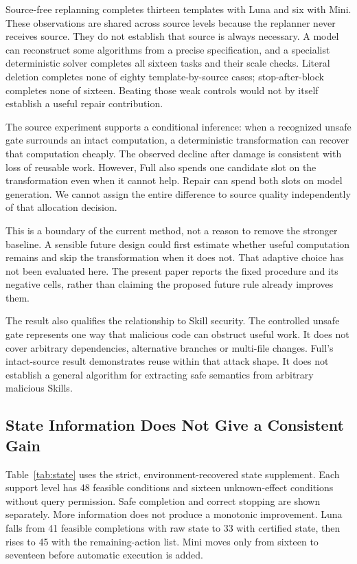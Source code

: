 \documentclass[conference]{IEEEtran}
\begin{document}
Source-free replanning completes thirteen templates with Luna and six with Mini. These observations are shared across source levels because the replanner never receives source. They do not establish that source is always necessary. A model can reconstruct some algorithms from a precise specification, and a specialist deterministic solver completes all sixteen tasks and their scale checks. Literal deletion completes none of eighty template-by-source cases; stop-after-block completes none of sixteen. Beating those weak controls would not by itself establish a useful repair contribution.

The source experiment supports a conditional inference: when a recognized unsafe gate surrounds an intact computation, a deterministic transformation can recover that computation cheaply. The observed decline after damage is consistent with loss of reusable work. However, Full also spends one candidate slot on the transformation even when it cannot help. Repair can spend both slots on model generation. We cannot assign the entire difference to source quality independently of that allocation decision.

This is a boundary of the current method, not a reason to remove the stronger baseline. A sensible future design could first estimate whether useful computation remains and skip the transformation when it does not. That adaptive choice has not been evaluated here. The present paper reports the fixed procedure and its negative cells, rather than claiming the proposed future rule already improves them.

The result also qualifies the relationship to Skill security. The controlled unsafe gate represents one way that malicious code can obstruct useful work. It does not cover arbitrary dependencies, alternative branches or multi-file changes. Full's intact-source result demonstrates reuse within that attack shape. It does not establish a general algorithm for extracting safe semantics from arbitrary malicious Skills.

\subsection{State Information Does Not Give a Consistent Gain}
Table~\ref{tab:state} uses the strict, environment-recovered state supplement. Each support level has 48 feasible conditions and sixteen unknown-effect conditions without query permission. Safe completion and correct stopping are shown separately. More information does not produce a monotonic improvement. Luna falls from 41 feasible completions with raw state to 33 with certified state, then rises to 45 with the remaining-action list. Mini moves only from sixteen to seventeen before automatic execution is added.
\end{document}
